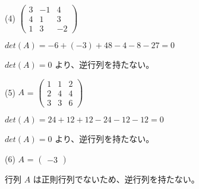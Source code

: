 \documentclass{jsarticle}
\begin{document}
\begin{description}
\begin{spacing}{1.2}
		\item[(4)]
			$ \begin{pmatrix}
				3 & -1 & 4 \\
				4 & 1 & 3 \\
				1 & 3 & -2
			\end{pmatrix} $

			$ det(A) = -6 + (-3) + 48 - 4 - 8 - 27 = 0 $

			$ det(A) = 0 $ より、逆行列を持たない。

		\item[(5)]
			$A$ =
			$ \begin{pmatrix}
				1 & 1 & 2 \\
				2 & 4 & 4 \\
				3 & 3 & 6
			\end{pmatrix} $

			$ det(A) = 24 + 12 + 12 - 24 - 12 - 12 = 0 $

			$ det(A) = 0 $ より、逆行列を持たない。

		\item[(6)]
			$A$ =
			$ \begin{pmatrix}
				-3
			\end{pmatrix} $

			行列 $A$ は正則行列でないため、逆行列を持たない。

		\end{spacing}
	\end{description}
\end{document}

